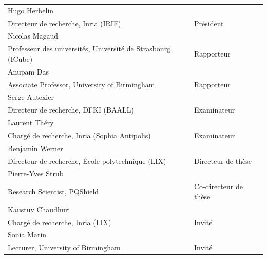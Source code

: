 \documentclass[a4paper]{article}
\newcommand{\jurynameA}{Hugo Herbelin}
\newcommand{\juryadressA}{Directeur de recherche, Inria (IRIF)}
\newcommand{\juryroleA}{Président}
\newcommand{\jurynameB}{Nicolas Magaud}
\newcommand{\juryadressB}{Professeur des universités, Université de Strasbourg (ICube)}
\newcommand{\juryroleB}{Rapporteur}
\newcommand{\jurynameC}{Anupam Das}
\newcommand{\juryadressC}{Associate Professor, University of Birmingham}
\newcommand{\juryroleC}{Rapporteur}
\newcommand{\jurynameD}{Serge Autexier}
\newcommand{\juryadressD}{Directeur de recherche, DFKI (BAALL)}
\newcommand{\juryroleD}{Examinateur}
\newcommand{\jurynameI}{Laurent Théry}
\newcommand{\juryadressI}{Chargé de recherche, Inria (Sophia Antipolis)}
\newcommand{\juryroleI}{Examinateur}
\newcommand{\jurynameE}{Benjamin Werner}
\newcommand{\juryadressE}{Directeur de recherche, École polytechnique (LIX)}
\newcommand{\juryroleE}{Directeur de thèse}
\newcommand{\jurynameF}{Pierre-Yves Strub}
\newcommand{\juryadressF}{Research Scientist, PQShield}
\newcommand{\juryroleF}{Co-directeur de thèse}
\newcommand{\jurynameG}{Kaustuv Chaudhuri}
\newcommand{\juryadressG}{Chargé de recherche, Inria (LIX)}
\newcommand{\juryroleG}{Invité}
\newcommand{\jurynameH}{Sonia Marin}
\newcommand{\juryadressH}{Lecturer, University of Birmingham}
\newcommand{\juryroleH}{Invité}
\begin{document}
\begin{textblock}{10}
	\label{jury} 																				%
	\begin{flushleft}
	\begin{tabular}{@{} L{9.64cm} R{4.5cm}}
		\jurynameA  \\ \juryadressA & \juryroleA \\[5pt]
		\jurynameB  \\ \juryadressB & \juryroleB \\[5pt]
		\jurynameC  \\ \juryadressC & \juryroleC \\[5pt]
		\jurynameD  \\ \juryadressD & \juryroleD \\[5pt]
		\jurynameI  \\ \juryadressI & \juryroleI \\[5pt]
		\jurynameE  \\ \juryadressE & \juryroleE \\[5pt]
		\jurynameF  \\ \juryadressF & \juryroleF \\[5pt]
		\jurynameG  \\ \juryadressG & \juryroleG \\[5pt]
		\jurynameH  \\ \juryadressH & \juryroleH \\[5pt]
	\end{tabular} 
	\end{flushleft}   
\end{textblock}
\end{document}
